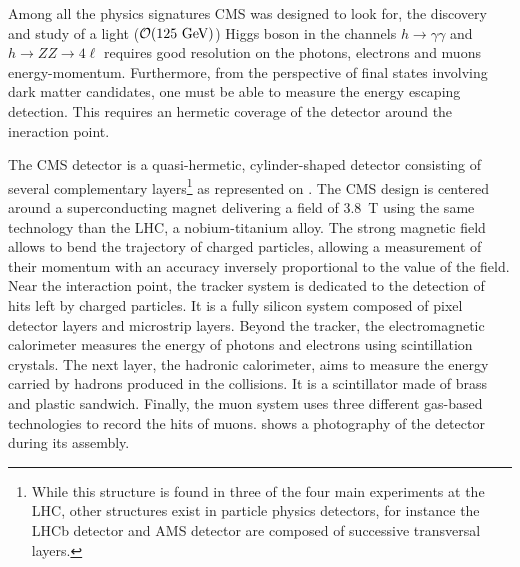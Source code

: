     Among all the physics signatures CMS was designed to look for, the discovery and study of a
    light ($\mathcal{O}(125 ~\text{GeV})$) Higgs boson in the channels $h\rightarrow\gamma\gamma$
    and $h\rightarrow ZZ \rightarrow 4\ell$ requires good resolution on the photons,
    electrons and muons energy-momentum. Furthermore, from the perspective of final
    states involving dark matter candidates, one must be able to measure
    the energy escaping detection. This requires an hermetic coverage of the detector around
    the ineraction point.


    The CMS detector is a quasi-hermetic, cylinder-shaped detector consisting of
    several complementary layers\footnote{While this structure is found in three of the four
    main experiments at the LHC, other structures exist in particle physics detectors,
    for instance the LHCb detector and AMS detector are composed of successive
    transversal layers.}
    as represented on .
    The CMS design is centered around a superconducting magnet delivering a field of
    3.8~T using the same technology than the LHC, a nobium-titanium alloy. The strong
    magnetic field allows to bend the trajectory of charged particles, allowing a
    measurement of their momentum with an accuracy inversely proportional to the value
    of the field.
    Near the interaction point, the tracker system is dedicated to
    the detection of hits left by charged particles. It is a fully silicon system composed of pixel detector
    layers and microstrip layers. Beyond the tracker, the electromagnetic
    calorimeter measures the energy of photons and electrons using
    scintillation crystals. The next layer, the hadronic calorimeter, aims to measure
    the energy carried by hadrons produced in the collisions. It is a scintillator made
    of brass and plastic sandwich. Finally, the muon system uses three different gas-based
    technologies to record the hits of muons. 
    shows a photography of the detector during its assembly.


